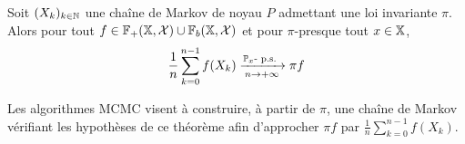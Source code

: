 \documentclass[10pt,a4paper]{article}
\begin{document}


\begin{Thm}\label{thm:ergodic}
	Soit $(X_k)_{k \in \mathbb{N}}$ une chaîne de Markov de noyau $P$ admettant une loi invariante $\pi$. Alors pour tout $f \in \mathbb{F}_+(\mathbb{X}, \mathcal{X}) \cup \mathbb{F}_b(\mathbb{X}, \mathcal{X})$ et pour $\pi$-presque tout $x \in \mathbb{X}$,
	$$\frac{1}{n} \sum_{k=0}^{n-1} f(X_k) \xrightarrow[n \to +\infty]{\PP_x\text{-}\ps} \pi f$$
\end{Thm}

Les algorithmes MCMC visent à construire, à partir de $\pi$, une chaîne de Markov vérifiant les hypothèses de ce théorème afin d'approcher $\pi f$ par $\frac{1}{n} \sum_{k=0}^{n-1} f(X_k)$.
\end{document}
